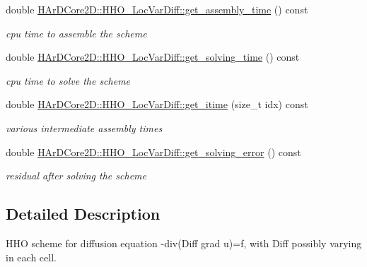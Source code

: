 \begin{DoxyCompactItemize}
\mbox{\label{group__HHO__LocVarDiff_ga9c37d2cf2744465d0bf50ff02fe185f9}} 
double \hyperlink{group__HHO__LocVarDiff_ga9c37d2cf2744465d0bf50ff02fe185f9}{H\+Ar\+D\+Core2\+D\+::\+H\+H\+O\+\_\+\+Loc\+Var\+Diff\+::get\+\_\+assembly\+\_\+time} () const
\begin{DoxyCompactList}\small\item\em cpu time to assemble the scheme \end{DoxyCompactList}\item 
\mbox{\label{group__HHO__LocVarDiff_gad184ecd99c5da4172395a210d0289c12}} 
double \hyperlink{group__HHO__LocVarDiff_gad184ecd99c5da4172395a210d0289c12}{H\+Ar\+D\+Core2\+D\+::\+H\+H\+O\+\_\+\+Loc\+Var\+Diff\+::get\+\_\+solving\+\_\+time} () const
\begin{DoxyCompactList}\small\item\em cpu time to solve the scheme \end{DoxyCompactList}\item 
\mbox{\label{group__HHO__LocVarDiff_ga61e65ce589db4203515ae8e1f5c30d0f}} 
double \hyperlink{group__HHO__LocVarDiff_ga61e65ce589db4203515ae8e1f5c30d0f}{H\+Ar\+D\+Core2\+D\+::\+H\+H\+O\+\_\+\+Loc\+Var\+Diff\+::get\+\_\+itime} (size\+\_\+t idx) const
\begin{DoxyCompactList}\small\item\em various intermediate assembly times \end{DoxyCompactList}\item 
\mbox{\label{group__HHO__LocVarDiff_ga9648b003ca1d519794bcc5407c8ce606}} 
double \hyperlink{group__HHO__LocVarDiff_ga9648b003ca1d519794bcc5407c8ce606}{H\+Ar\+D\+Core2\+D\+::\+H\+H\+O\+\_\+\+Loc\+Var\+Diff\+::get\+\_\+solving\+\_\+error} () const
\begin{DoxyCompactList}\small\item\em residual after solving the scheme \end{DoxyCompactList}\end{DoxyCompactItemize}


\subsection{Detailed Description}
H\+HO scheme for diffusion equation -\/div(Diff grad u)=f, with Diff possibly varying in each cell. 



